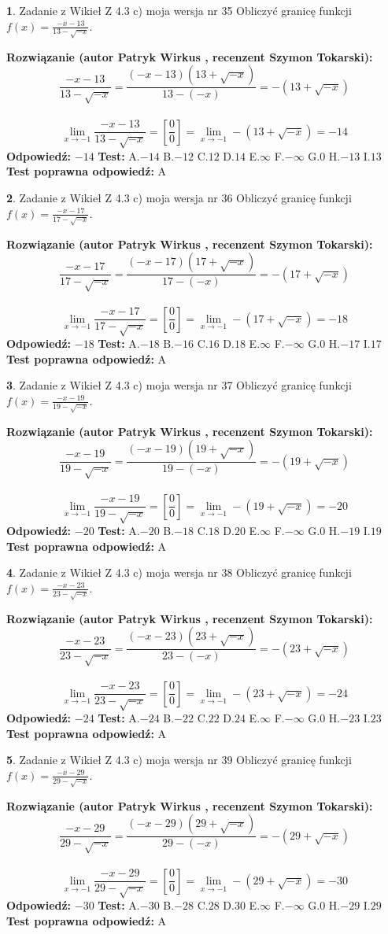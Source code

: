 \documentclass[12pt, a4paper]{article}
\theoremstyle{definition} %
\newtheorem{zad}{}
\newcommand{\zadStart}[1]{\begin{zad}#1\newline}
\newcommand{\zadStop}{\end{zad}}
\newcommand{\rozwStart}[2]{\noindent \textbf{Rozwiązanie (autor #1 , recenzent #2): }\newline}
\newcommand{\rozwStop}{\newline}
\newcommand{\odpStart}{\noindent \textbf{Odpowiedź:}\newline}
\newcommand{\odpStop}{\newline}
\newcommand{\testStart}{\noindent \textbf{Test:}\newline}
\newcommand{\testStop}{\newline}
\newcommand{\kluczStart}{\noindent \textbf{Test poprawna odpowiedź:}\newline}
\newcommand{\kluczStop}{\newline}
\begin{document}
\zadStart{Zadanie z Wikieł Z 4.3 c) moja wersja nr 35}
Obliczyć granicę funkcji $f(x)=\frac{-x-13}{13-\sqrt{-x}}$.
\zadStop
\rozwStart{Patryk Wirkus}{Szymon Tokarski}
$$\frac{-x-13}{13-\sqrt{-x}}=\frac{(-x-13)(13+\sqrt{-x})}{13-(-x)}=-(13+\sqrt{-x})$$
\\
$$\lim\limits_{x\to-1}\frac{-x-13}{13-\sqrt{-x}}=[\frac{0}{0}]=\lim\limits_{x\to-1}-(13+\sqrt{-x}) =-14$$
\rozwStop
\odpStart
$-14$
\odpStop
\testStart
A.$-14$
B.$-12$
C.$12$
D.$14$
E.$\infty$
F.$-\infty$
G.$0$
H.$-13$
I.$13$
\testStop
\kluczStart
A
\kluczStop



\zadStart{Zadanie z Wikieł Z 4.3 c) moja wersja nr 36}
Obliczyć granicę funkcji $f(x)=\frac{-x-17}{17-\sqrt{-x}}$.
\zadStop
\rozwStart{Patryk Wirkus}{Szymon Tokarski}
$$\frac{-x-17}{17-\sqrt{-x}}=\frac{(-x-17)(17+\sqrt{-x})}{17-(-x)}=-(17+\sqrt{-x})$$
\\
$$\lim\limits_{x\to-1}\frac{-x-17}{17-\sqrt{-x}}=[\frac{0}{0}]=\lim\limits_{x\to-1}-(17+\sqrt{-x}) =-18$$
\rozwStop
\odpStart
$-18$
\odpStop
\testStart
A.$-18$
B.$-16$
C.$16$
D.$18$
E.$\infty$
F.$-\infty$
G.$0$
H.$-17$
I.$17$
\testStop
\kluczStart
A
\kluczStop



\zadStart{Zadanie z Wikieł Z 4.3 c) moja wersja nr 37}
Obliczyć granicę funkcji $f(x)=\frac{-x-19}{19-\sqrt{-x}}$.
\zadStop
\rozwStart{Patryk Wirkus}{Szymon Tokarski}
$$\frac{-x-19}{19-\sqrt{-x}}=\frac{(-x-19)(19+\sqrt{-x})}{19-(-x)}=-(19+\sqrt{-x})$$
\\
$$\lim\limits_{x\to-1}\frac{-x-19}{19-\sqrt{-x}}=[\frac{0}{0}]=\lim\limits_{x\to-1}-(19+\sqrt{-x}) =-20$$
\rozwStop
\odpStart
$-20$
\odpStop
\testStart
A.$-20$
B.$-18$
C.$18$
D.$20$
E.$\infty$
F.$-\infty$
G.$0$
H.$-19$
I.$19$
\testStop
\kluczStart
A
\kluczStop



\zadStart{Zadanie z Wikieł Z 4.3 c) moja wersja nr 38}
Obliczyć granicę funkcji $f(x)=\frac{-x-23}{23-\sqrt{-x}}$.
\zadStop
\rozwStart{Patryk Wirkus}{Szymon Tokarski}
$$\frac{-x-23}{23-\sqrt{-x}}=\frac{(-x-23)(23+\sqrt{-x})}{23-(-x)}=-(23+\sqrt{-x})$$
\\
$$\lim\limits_{x\to-1}\frac{-x-23}{23-\sqrt{-x}}=[\frac{0}{0}]=\lim\limits_{x\to-1}-(23+\sqrt{-x}) =-24$$
\rozwStop
\odpStart
$-24$
\odpStop
\testStart
A.$-24$
B.$-22$
C.$22$
D.$24$
E.$\infty$
F.$-\infty$
G.$0$
H.$-23$
I.$23$
\testStop
\kluczStart
A
\kluczStop



\zadStart{Zadanie z Wikieł Z 4.3 c) moja wersja nr 39}
Obliczyć granicę funkcji $f(x)=\frac{-x-29}{29-\sqrt{-x}}$.
\zadStop
\rozwStart{Patryk Wirkus}{Szymon Tokarski}
$$\frac{-x-29}{29-\sqrt{-x}}=\frac{(-x-29)(29+\sqrt{-x})}{29-(-x)}=-(29+\sqrt{-x})$$
\\
$$\lim\limits_{x\to-1}\frac{-x-29}{29-\sqrt{-x}}=[\frac{0}{0}]=\lim\limits_{x\to-1}-(29+\sqrt{-x}) =-30$$
\rozwStop
\odpStart
$-30$
\odpStop
\testStart
A.$-30$
B.$-28$
C.$28$
D.$30$
E.$\infty$
F.$-\infty$
G.$0$
H.$-29$
I.$29$
\testStop
\kluczStart
A
\kluczStop
\end{document}
